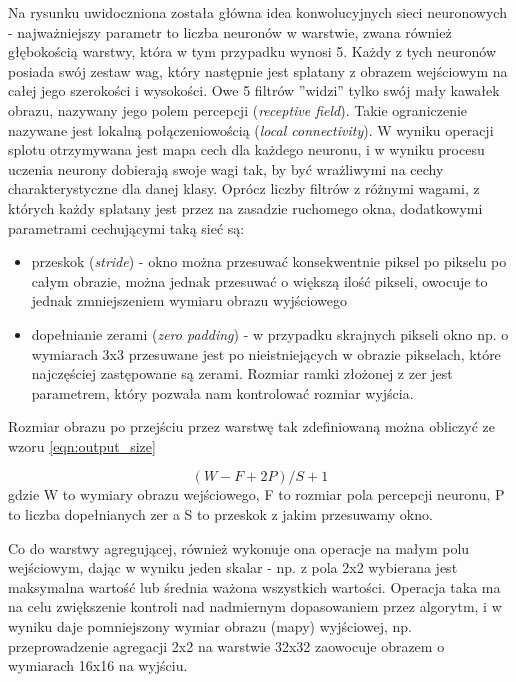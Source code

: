 Na rysunku uwidoczniona została główna idea konwolucyjnych sieci neuronowych - najważniejszy parametr to liczba neuronów w warstwie, zwana również głębokością warstwy, która w tym przypadku wynosi 5.
Każdy z tych neuronów posiada swój zestaw wag, który następnie jest splatany z obrazem wejściowym na całej jego szerokości i wysokości.
Owe 5 filtrów ''widzi'' tylko swój mały kawałek obrazu, nazywany jego polem percepcji (\textit{receptive field}).
Takie ograniczenie nazywane jest lokalną połączeniowością (\textit{local connectivity}).
W wyniku operacji splotu otrzymywana jest mapa cech dla każdego neuronu, i w wyniku procesu uczenia neurony dobierają swoje wagi tak, by być wrażliwymi na cechy charakterystyczne dla danej klasy.
Oprócz liczby filtrów z różnymi wagami, z których każdy splatany jest przez na zasadzie ruchomego okna, dodatkowymi parametrami cechującymi taką sieć są:

\begin{itemize}
	\item przeskok (\textit{stride}) - okno można przesuwać konsekwentnie piksel po pikselu po całym obrazie, można jednak przesuwać o większą ilość pikseli, owocuje to jednak zmniejszeniem wymiaru obrazu wyjściowego
	\item dopełnianie zerami (\textit{zero padding}) - w przypadku skrajnych pikseli okno np. o wymiarach 3x3 przesuwane jest po nieistniejących w obrazie pikselach, które najczęściej zastępowane są zerami.
	 			Rozmiar ramki złożonej z zer jest parametrem, który pozwala nam kontrolować rozmiar wyjścia.
\end{itemize}

Rozmiar obrazu po przejściu przez warstwę tak zdefiniowaną można obliczyć ze wzoru \ref{eqn:output_size}

\begin{equation}\label{eqn:output_size}
(W - F + 2P)/S + 1
\end{equation}
gdzie W to wymiary obrazu wejściowego, F to rozmiar pola percepcji neuronu, P to liczba dopełnianych zer a S to przeskok z jakim przesuwamy okno.

Co do warstwy agregującej, również wykonuje ona operacje na małym polu wejściowym, dając w wyniku jeden skalar - np. z pola 2x2 wybierana jest maksymalna wartość lub średnia ważona wszystkich wartości.
Operacja taka ma na celu zwiększenie kontroli nad nadmiernym dopasowaniem przez algorytm, i w wyniku daje pomniejszony wymiar obrazu (mapy) wyjściowej, np. przeprowadzenie agregacji 2x2 na warstwie 32x32 zaowocuje obrazem o wymiarach 16x16 na wyjściu.

